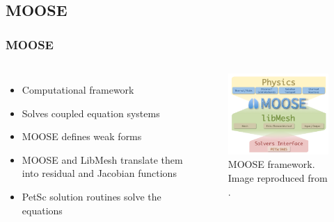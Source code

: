 \subsection{MOOSE}
\begin{frame}
\frametitle{MOOSE}
\begin{columns}
    \column[t]{4cm}
	\begin{itemize}
    	\item Computational framework
    	\item Solves coupled equation systems
    	\item MOOSE defines weak forms
    	\item MOOSE and LibMesh translate them into residual and Jacobian functions
    	\item PetSc solution routines solve the equations
    \end{itemize}

	\column[t]{6cm}
	\begin{figure}[htbp!]
		\begin{center}
			\includegraphics[width=6cm]{moose}
		\end{center}
		\caption{MOOSE framework. Image reproduced from \cite{inl_workshop_2020}.}
	\end{figure}
\end{columns}
\end{frame}


